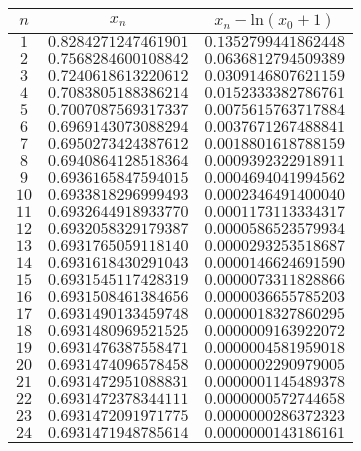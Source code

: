 \documentclass{article}
\begin{document}
\begin{enumerate}
\begin{enumerate}
\begin{table}[H]
\centering
\begin{tabular}{ |c|c|c| }
\hline
$n$ & $x_n$ & $x_n - \mbox{ln}(x_0+1)$ \\
\hline
$1$ & $0.8284271247461901$ & $0.1352799441862448$ \\
 \hline
$2$ & $0.7568284600108842$ & $0.0636812794509389$ \\
 \hline
$3$ & $0.7240618613220612$ & $0.0309146807621159$ \\
 \hline
$4$ & $0.7083805188386214$ & $0.0152333382786761$ \\
 \hline
$5$ & $0.7007087569317337$ & $0.0075615763717884$ \\
 \hline
$6$ & $0.6969143073088294$ & $0.0037671267488841$ \\
 \hline
$7$ & $0.6950273424387612$ & $0.0018801618788159$ \\
 \hline
$8$ & $0.6940864128518364$ & $0.0009392322918911$ \\
 \hline
$9$ & $0.6936165847594015$ & $0.0004694041994562$ \\
 \hline
$10$ & $0.6933818296999493$ & $0.0002346491400040$ \\
 \hline
$11$ & $0.6932644918933770$ & $0.0001173113334317$ \\
 \hline
$12$ & $0.6932058329179387$ & $0.0000586523579934$ \\
 \hline
$13$ & $0.6931765059118140$ & $0.0000293253518687$ \\
 \hline
$14$ & $0.6931618430291043$ & $0.0000146624691590$ \\
 \hline
$15$ & $0.6931545117428319$ & $0.0000073311828866$ \\
 \hline
$16$ & $0.6931508461384656$ & $0.0000036655785203$ \\
 \hline
$17$ & $0.6931490133459748$ & $0.0000018327860295$ \\
 \hline
$18$ & $0.6931480969521525$ & $0.0000009163922072$ \\
 \hline
$19$ & $0.6931476387558471$ & $0.0000004581959018$ \\
 \hline
$20$ & $0.6931474096578458$ & $0.0000002290979005$ \\
 \hline
$21$ & $0.6931472951088831$ & $0.0000001145489378$ \\
 \hline
$22$ & $0.6931472378344111$ & $0.0000000572744658$ \\
 \hline
$23$ & $0.6931472091971775$ & $0.0000000286372323$ \\
 \hline
$24$ & $0.6931471948785614$ & $0.0000000143186161$ \\

\end{tabular}
\end{table}
\end{enumerate}
\end{enumerate}
\end{document}
